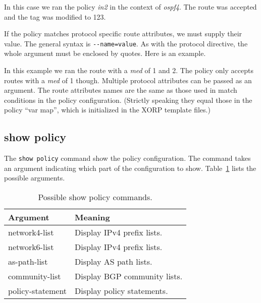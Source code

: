In this case we ran the policy {\em in2} in the context of {\em ospf4}.  The
route was accepted and the tag was modified to 123.

If the policy matches protocol specific route attributes, we must supply their
value.  The general syntax is \verb|--name=value|.  As with the protocol
directive, the whole argument must be enclosed by quotes.  Here is an example.

\noindent{}

In this example we ran the route with a {\em med} of 1 and 2.  The policy only
accepts routes with a {\em med} of 1 though.  Multiple protocol attributes can
be passed as an argument.  The route attributes names are the same as those used
in match conditions in the policy configuration.  (Strictly speaking they equal
those in the policy ``var map'', which is initialized in the XORP template
files.)

\subsection{show policy}
The {\tt show policy} command show the policy configuration.  The command takes
an argument indicating which part of the configuration to show.
Table~\ref{tab:policy:show} lists the possible arguments.
\begin{table}
\begin{center}
\begin{tabular}{|l|l|}
\hline
Argument	& Meaning \\
\hline\hline
network4-list	 & Display IPv4 prefix lists. \\
network6-list	 & Display IPv4 prefix lists. \\
as-path-list	 & Display AS path lists. \\
community-list   & Display BGP community lists. \\
policy-statement & Display policy statements. \\
\hline
\end{tabular}
\end{center}
\caption{\label{tab:policy:show}Possible show policy commands.}
\end{table}

